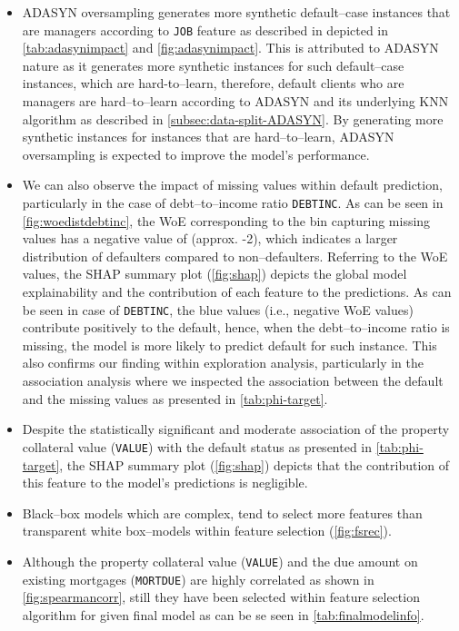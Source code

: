 \begin{itemize}\setlength\itemsep{0em}
    \item ADASYN oversampling generates more synthetic default--case instances that are managers according to \texttt{JOB} feature as described in depicted in \autoref{tab:adasynimpact} and \autoref{fig:adasynimpact}.
    This is attributed to ADASYN nature as it generates more synthetic instances for such default--case instances, which are hard-to--learn, therefore, default clients who are managers are hard--to--learn according to ADASYN and its underlying KNN algorithm as described in \autoref{subsec:data-split-ADASYN}. By generating more synthetic instances for instances that are hard--to--learn, ADASYN oversampling is expected to improve the model's performance.
    \item We can also observe the impact of missing values within default prediction, particularly in the case of debt--to--income ratio \texttt{DEBTINC}. As can be seen in \autoref{fig:woedistdebtinc}, the WoE corresponding to the bin capturing missing values has a negative value of (approx. -2), which indicates a larger distribution of defaulters compared to non--defaulters.
     Referring to the WoE values, the SHAP summary plot (\autoref{fig:shap}) depicts the global model explainability and the contribution of each feature to the predictions. As can be seen in case of \texttt{DEBTINC}, the blue values (i.e., negative WoE values) contribute positively to the default, hence, when the debt--to--income ratio is missing, the model is more likely to predict default for such instance.
     This also confirms our finding within exploration analysis, particularly in the association analysis where we inspected the association between the default and the missing values as presented in \autoref{tab:phi-target}.
     \item Despite the statistically significant and moderate association of the property collateral value (\texttt{VALUE}) with the default status as presented in \autoref{tab:phi-target}, the SHAP summary plot (\autoref{fig:shap}) depicts that the contribution of this feature to the model's predictions is negligible.
     \item Black--box models which are complex, tend to select more features than transparent white box--models within feature selection (\autoref{fig:fsrec}).
    \item Although the property collateral value (\texttt{VALUE}) and the due amount on existing mortgages (\texttt{MORTDUE}) are highly correlated as shown in \autoref{fig:spearmancorr}, still they have been selected within feature selection algorithm for given final model as can be se seen in \autoref{tab:finalmodelinfo}.

\end{itemize}
